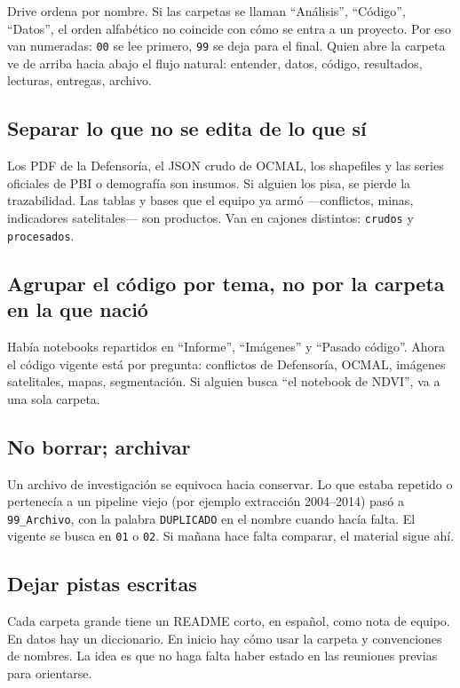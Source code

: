 \documentclass[11pt,a4paper]{article}
\begin{document}
Drive ordena por nombre. Si las carpetas se llaman ``Análisis'', ``Código'', ``Datos'', el orden alfabético no coincide con cómo se entra a un proyecto. Por eso van numeradas: \texttt{00} se lee primero, \texttt{99} se deja para el final. Quien abre la carpeta ve de arriba hacia abajo el flujo natural: entender, datos, código, resultados, lecturas, entregas, archivo.

\subsection{Separar lo que no se edita de lo que sí}

Los PDF de la Defensoría, el JSON crudo de OCMAL, los shapefiles y las series oficiales de PBI o demografía son insumos. Si alguien los pisa, se pierde la trazabilidad. Las tablas y bases que el equipo ya armó ---conflictos, minas, indicadores satelitales--- son productos. Van en cajones distintos: \texttt{crudos} y \texttt{procesados}.

\subsection{Agrupar el código por tema, no por la carpeta en la que nació}

Había notebooks repartidos en ``Informe'', ``Imágenes'' y ``Pasado código''. Ahora el código vigente está por pregunta: conflictos de Defensoría, OCMAL, imágenes satelitales, mapas, segmentación. Si alguien busca ``el notebook de NDVI'', va a una sola carpeta.

\subsection{No borrar; archivar}

Un archivo de investigación se equivoca hacia conservar. Lo que estaba repetido o pertenecía a un pipeline viejo (por ejemplo extracción 2004--2014) pasó a \texttt{99\_Archivo}, con la palabra \texttt{DUPLICADO} en el nombre cuando hacía falta. El vigente se busca en \texttt{01} o \texttt{02}. Si mañana hace falta comparar, el material sigue ahí.

\subsection{Dejar pistas escritas}

Cada carpeta grande tiene un README corto, en español, como nota de equipo. En datos hay un diccionario. En inicio hay cómo usar la carpeta y convenciones de nombres. La idea es que no haga falta haber estado en las reuniones previas para orientarse.
\end{document}
